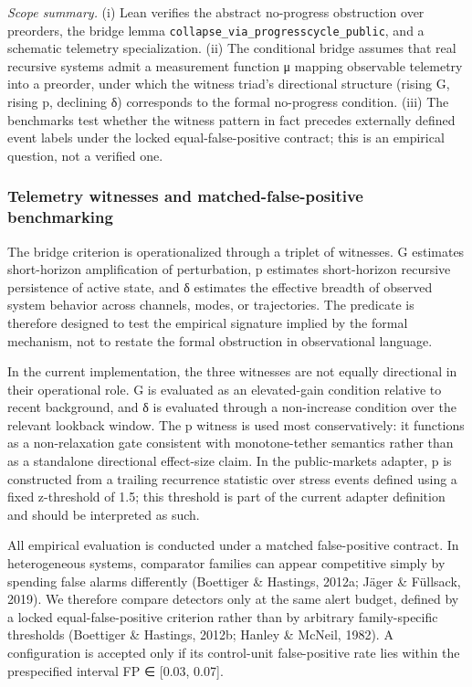 \documentclass[
  11pt,
]{article}
\begin{document}
\emph{Scope summary.} (i) Lean verifies the abstract no-progress
obstruction over preorders, the bridge lemma
\texttt{collapse\_via\_progresscycle\_public}, and a schematic telemetry
specialization. (ii) The conditional bridge assumes that real recursive
systems admit a measurement function μ mapping observable telemetry into
a preorder, under which the witness triad's directional structure
(rising G, rising p, declining δ) corresponds to the formal no-progress
condition. (iii) The benchmarks test whether the witness pattern in fact
precedes externally defined event labels under the locked
equal-false-positive contract; this is an empirical question, not a
verified one.

\subsubsection{Telemetry witnesses and matched-false-positive
benchmarking}\label{telemetry-witnesses-and-matched-false-positive-benchmarking}

The bridge criterion is operationalized through a triplet of witnesses.
G estimates short-horizon amplification of perturbation, p estimates
short-horizon recursive persistence of active state, and δ estimates the
effective breadth of observed system behavior across channels, modes, or
trajectories. The predicate is therefore designed to test the empirical
signature implied by the formal mechanism, not to restate the formal
obstruction in observational language.

In the current implementation, the three witnesses are not equally
directional in their operational role. G is evaluated as an
elevated-gain condition relative to recent background, and δ is
evaluated through a non-increase condition over the relevant lookback
window. The p witness is used most conservatively: it functions as a
non-relaxation gate consistent with monotone-tether semantics rather
than as a standalone directional effect-size claim. In the
public-markets adapter, p is constructed from a trailing recurrence
statistic over stress events defined using a fixed z-threshold of 1.5;
this threshold is part of the current adapter definition and should be
interpreted as such.

All empirical evaluation is conducted under a matched false-positive
contract. In heterogeneous systems, comparator families can appear
competitive simply by spending false alarms differently (Boettiger \&
Hastings, 2012a; Jäger \& Füllsack, 2019). We therefore compare
detectors only at the same alert budget, defined by a locked
equal-false-positive criterion rather than by arbitrary family-specific
thresholds (Boettiger \& Hastings, 2012b; Hanley \& McNeil, 1982). A
configuration is accepted only if its control-unit false-positive rate
lies within the prespecified interval FP ∈ {[}0.03, 0.07{]}.
\end{document}
